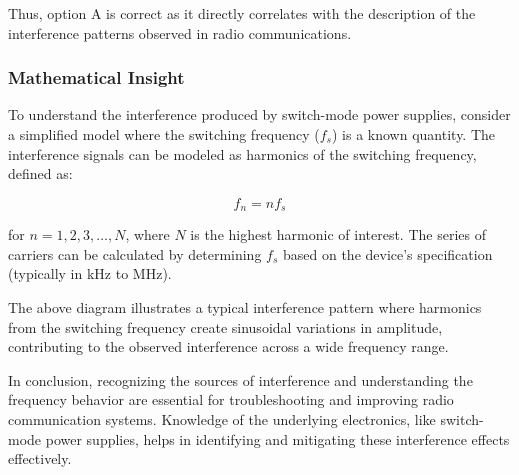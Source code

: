Thus, option A is correct as it directly correlates with the description of the interference patterns observed in radio communications.

\subsubsection{Mathematical Insight}

To understand the interference produced by switch-mode power supplies, consider a simplified model where the switching frequency (\(f_s\)) is a known quantity. The interference signals can be modeled as harmonics of the switching frequency, defined as:

\[
f_n = n f_s
\]

for \(n = 1, 2, 3, \ldots, N\), where \(N\) is the highest harmonic of interest. The series of carriers can be calculated by determining \(f_s\) based on the device's specification (typically in kHz to MHz).


The above diagram illustrates a typical interference pattern where harmonics from the switching frequency create sinusoidal variations in amplitude, contributing to the observed interference across a wide frequency range.

In conclusion, recognizing the sources of interference and understanding the frequency behavior are essential for troubleshooting and improving radio communication systems. Knowledge of the underlying electronics, like switch-mode power supplies, helps in identifying and mitigating these interference effects effectively.
